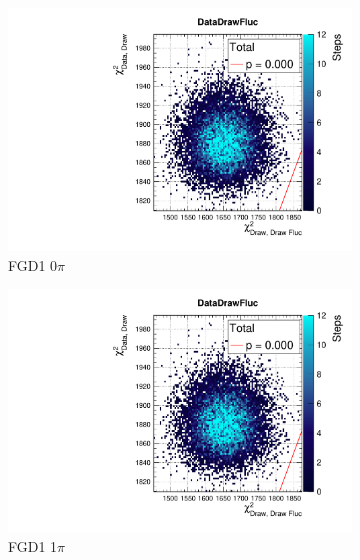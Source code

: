 \begin{figure}[h]
	\begin{subfigure}[t]{0.32\textwidth}
		\includegraphics[width=\textwidth, trim={20mm 6mm 4mm 11mm}, clip,page=5]{figures/mach3/data/postpred/2017b_NewData_NewDet_UpdXsecStep_2Xsec_4Det_5Flux_0_PostPred_procs}
		\caption{FGD1 0$\pi$}
	\end{subfigure}
	\begin{subfigure}[t]{0.32\textwidth}
		\includegraphics[width=\textwidth, trim={20mm 6mm 4mm 11mm}, clip,page=14]{figures/mach3/data/postpred/2017b_NewData_NewDet_UpdXsecStep_2Xsec_4Det_5Flux_0_PostPred_procs}
		\caption{FGD1 1$\pi$}
	\end{subfigure}
	\begin{subfigure}[t]{0.32\textwidth}

\end{subfigure}
\end{figure}
